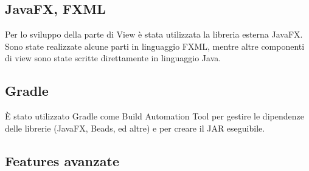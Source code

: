 \documentclass[a4paper,12pt]{report}
\begin{document}
\subsection{JavaFX, FXML}
Per lo sviluppo della parte di View è stata utilizzata la libreria esterna JavaFX.
Sono state realizzate alcune parti in linguaggio FXML, mentre altre componenti di view sono state scritte direttamente in linguaggio Java.
\subsection{Gradle}
È stato utilizzato Gradle come Build Automation Tool per gestire le dipendenze delle librerie (JavaFX, Beads, ed altre) e per creare il JAR eseguibile.

\subsection{Features avanzate}
\end{document}
